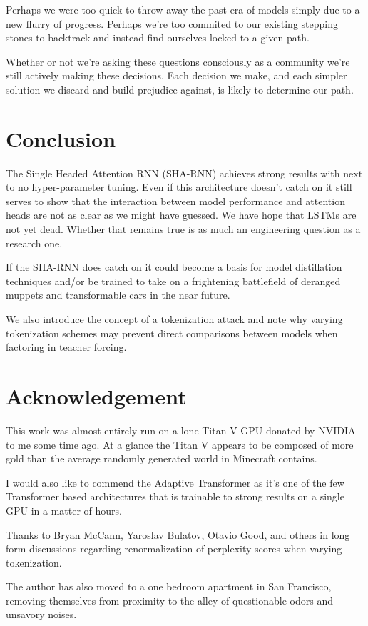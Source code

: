 \documentclass{article}
\begin{document}
Perhaps we were too quick to throw away the past era of models simply due to a new flurry of progress.
Perhaps we're too commited to our existing stepping stones to backtrack and instead find ourselves locked to a given path.

Whether or not we're asking these questions consciously as a community we're still actively making these decisions.
Each decision we make, and each simpler solution we discard and build prejudice against, is likely to determine our path.

\section{Conclusion}

The Single Headed Attention RNN (SHA-RNN)
achieves strong results with next to no hyper-parameter tuning.
Even if this architecture doesn't catch on it still serves to show that the interaction between model performance and attention heads are not as clear as we might have guessed.
We have hope that LSTMs are not yet dead.
Whether that remains true is as much an engineering question as a research one.

If the SHA-RNN does catch on it could become a basis for model distillation techniques and/or be trained to take on a frightening battlefield of deranged muppets and transformable cars in the near future.

We also introduce the concept of a tokenization attack and note why varying tokenization schemes may prevent direct comparisons between models when factoring in teacher forcing.



\section{Acknowledgement}

This work was almost entirely run on a lone Titan V GPU donated by NVIDIA to me some time ago.
At a glance the Titan V appears to be composed of more gold than the average randomly generated world in Minecraft contains.

I would also like to commend the Adaptive Transformer \cite{sukhbaatar2019adaptive} as it's one of the few Transformer based architectures that is trainable to strong results on a single GPU in a matter of hours.

Thanks to Bryan McCann, Yaroslav Bulatov, Otavio Good, and others in long form discussions regarding renormalization of perplexity scores when varying tokenization.

The author has also moved to a one bedroom apartment in San Francisco, removing themselves from proximity to the alley of questionable odors and unsavory noises.



\end{document}
